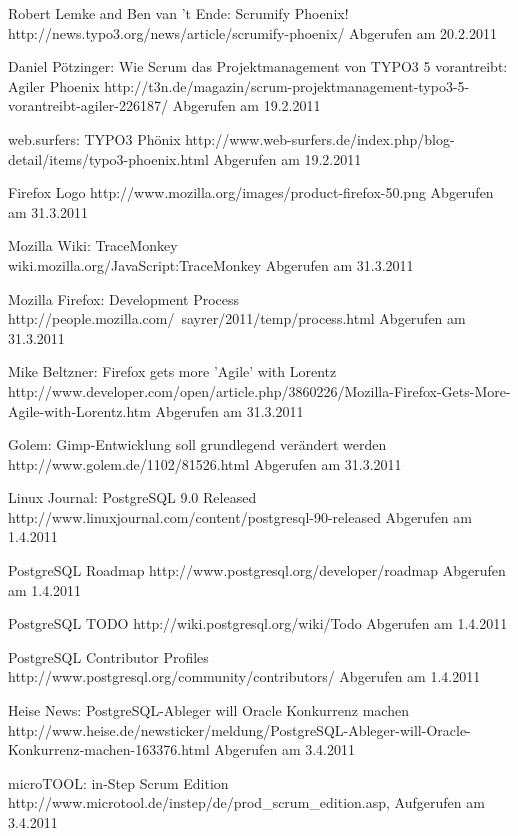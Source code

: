 \documentclass[german,english]{header}
\begin{document}
\begin{thebibliography}{5}
Robert Lemke and Ben van 't Ende:
Scrumify Phoenix!
http://news.typo3.org/news/article/scrumify-phoenix/ Abgerufen am 20.2.2011

Daniel Pötzinger:
Wie Scrum das Projektmanagement von TYPO3 5 vorantreibt: Agiler Phoenix
http://t3n.de/magazin/scrum-projektmanagement-typo3-5-vorantreibt-agiler-226187/ Abgerufen am 19.2.2011

web.surfers:
TYPO3 Phönix
http://www.web-surfers.de/index.php/blog-detail/items/typo3-phoenix.html Abgerufen am 19.2.2011

Firefox Logo
http://www.mozilla.org/images/product-firefox-50.png Abgerufen am 31.3.2011


Mozilla Wiki:
TraceMonkey
\\wiki.mozilla.org/JavaScript:TraceMonkey Abgerufen am 31.3.2011

Mozilla Firefox: Development Process
http://people.mozilla.com/~sayrer/2011/temp/process.html Abgerufen am 31.3.2011

Mike Beltzner:
Firefox gets more 'Agile' with Lorentz
\\http://www.developer.com/open/article.php/3860226/Mozilla-Firefox-Gets-More-Agile-with-Lorentz.htm Abgerufen am 31.3.2011

Golem: Gimp-Entwicklung soll grundlegend verändert werden
http://www.golem.de/1102/81526.html Abgerufen am 31.3.2011

Linux Journal:
PostgreSQL 9.0 Released
http://www.linuxjournal.com/content/postgresql-90-released Abgerufen am 1.4.2011

PostgreSQL Roadmap
http://www.postgresql.org/developer/roadmap Abgerufen am 1.4.2011

PostgreSQL TODO
http://wiki.postgresql.org/wiki/Todo Abgerufen am 1.4.2011

PostgreSQL Contributor Profiles
http://www.postgresql.org/community/contributors/ Abgerufen am 1.4.2011

Heise News:
PostgreSQL-Ableger will Oracle Konkurrenz machen
http://www.heise.de/newsticker/meldung/PostgreSQL-Ableger-will-Oracle-Konkurrenz-machen-163376.html Abgerufen am 3.4.2011

microTOOL:
in-Step Scrum Edition
http://www.microtool.de/instep/de/prod\_scrum\_edition.asp,
Aufgerufen am 3.4.2011


\end{thebibliography}
\end{document}
